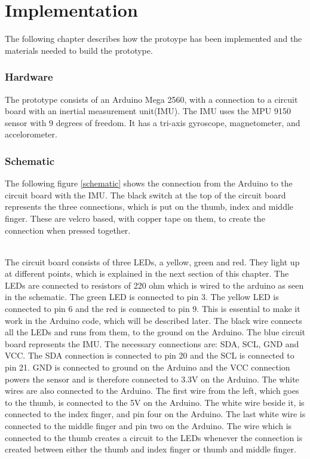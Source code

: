 \chapter{Implementation}

The following chapter describes how the protoype has been implemented and the materials needed to build the prototype. 

\subsection{Hardware}

The prototype consists of an Arduino Mega 2560\citep{Arduino}, with a connection to a circuit board with an inertial measurement unit(IMU). 
The IMU uses the MPU 9150 sensor with 9 degrees of freedom\citep{MPU}. It has a tri-axis gyroscope, magnetometer, and accelorometer.

\subsection{Schematic} 

The following figure \ref{schematic} shows the connection from the Arduino to the circuit board with the IMU. The black switch at the top of the circuit board
represents the three connections, which is put on the thumb, index and middle finger. These are velcro based, with copper tape on them, to create the connection when pressed together. 

\begin{minipage}{\linewidth}%
\label{schematic}
\end{minipage}\\

The circuit board consists of three LEDs, a yellow, green and red. They light up at different points, which is explained in the next section of this chapter.
The LEDs are connected to resistors of 220 ohm which is wired to the arduino as seen in the schematic. The green LED is connected to pin 3. 
The yellow LED is connected to pin 6 and the red is connected to pin 9. This is essential to make it work in the Arduino code, which will be described later. 
The black wire connects all the LEDs and runs from them, to the ground on the Arduino. The blue circuit board represents the IMU. The necessary connections are: SDA, SCL, GND and VCC. 
The SDA connection is connected to pin 20 and the SCL is connected to pin 21. GND is connected to ground on the Arduino and the VCC connection powers the sensor and is therefore
connected to 3.3V on the Arduino. The white wires are also connected to the Arduino. The first wire from the left, which goes to the thumb, is connected to the 5V on the Arduino. 
The white wire beside it, is connected to the index finger, and pin four on the Arduino. The last white wire is connected to the middle finger and pin two on the Arduino.
The wire which is connected to the thumb creates a circuit to the LEDs whenever the connection is created between either the thumb and index finger or thumb and middle finger. \\


